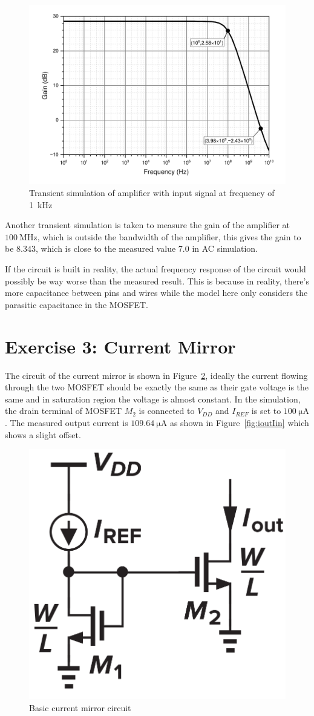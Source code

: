 \documentclass[12pt]{article}   %
\begin{document}
	\begin{figure}[htbp]
		\centering
		\includegraphics[width=0.7\linewidth]{Figures/E2_Inverting_Amplifier/AC_analysis}
		\caption{Transient simulation of amplifier with input signal at frequency of \SI{1}{\kilo\hertz}}
		\label{fig:ac_analysis_inv}
	\end{figure}
	
	Another transient simulation is taken to measure the gain of the amplifier at $\SI{100}{\mega\hertz}$, which is outside the bandwidth of the amplifier, this gives the gain to be $8.343$, which is close to the measured value $7.0$ in AC simulation.
	
	If the circuit is built in reality, the actual frequency response of the circuit would possibly be way worse than the measured result. This is because in reality, there's more capacitance between pins and wires while the model here only considers the parasitic capacitance in the MOSFET.
	
	\newpage
	
	\section{Exercise 3: Current Mirror}
	
	The circuit of the current mirror is shown in Figure~\ref{fig:currentMirror}, ideally the current flowing through the two MOSFET should be exactly the same as their gate voltage is the same and in saturation region the voltage is almost constant. In the simulation, the drain terminal of MOSFET $M_2$ is connected to $V_{DD}$ and $I_{REF}$ is set to $\SI{100}{\micro\ampere}$. The measured output current is $\SI{109.64}{\micro\ampere}$ as shown in Figure~\ref{fig:ioutIin} which shows a slight offset.
	
	\begin{figure}[htbp]
		\centering
		\includegraphics[width=0.3\linewidth]{Figures/E3_Current_Mirror/current_mirror}
		\caption{Basic current mirror circuit\cite{razaviDesignAnalogCMOS2017}}
		\label{fig:currentMirror}
	\end{figure}
	
\end{document}
